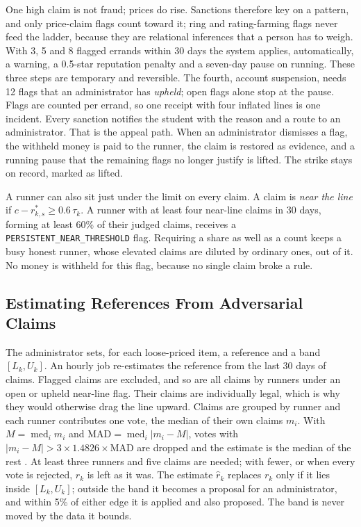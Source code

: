 \documentclass[journal]{IEEEtran}
\newcommand{\code}[1]{\texttt{#1}}
\begin{document}
One high claim is not fraud; prices do rise. Sanctions therefore key on a pattern,
and only price-claim flags count toward it; ring and rating-farming flags never feed
the ladder, because they are relational inferences that a person has to weigh. With
3, 5 and 8 flagged errands within 30 days the system applies, automatically, a
warning, a 0.5-star reputation penalty and a seven-day pause on running. These three
steps are temporary and reversible. The fourth, account suspension, needs 12 flags
that an administrator has \emph{upheld}; open flags alone stop at the pause. Flags
are counted per errand, so one receipt with four inflated lines is one incident.
Every sanction notifies the student with the reason and a route to an administrator.
That is the appeal path. When an administrator dismisses a flag, the withheld money
is paid to the runner, the claim is restored as evidence, and a running pause that
the remaining flags no longer justify is lifted. The strike stays on record, marked
as lifted.

A runner can also sit just under the limit on every claim. A claim is \emph{near the
line} if $c-r^*_{k,s}\ge0.6\,\tau_k$. A runner with at least four near-line claims in 30
days, forming at least 60\% of their judged claims, receives a
\code{PERSISTENT\_NEAR\_THRESHOLD} flag. Requiring a share as well as a count keeps
a busy honest runner, whose elevated claims are diluted by ordinary ones, out of it.
No money is withheld for this flag, because no single claim broke a rule.

\subsection{Estimating References From Adversarial Claims}\label{sec:design-reference}
The administrator sets, for each loose-priced item, a reference and a band
$[L_k,U_k]$. An hourly job re-estimates the reference from the last 30 days of
claims. Flagged claims are excluded, and so are all claims by runners under an open
or upheld near-line flag. Their claims are individually legal, which is why they
would otherwise drag the line upward. Claims are grouped by runner and each
runner contributes one vote, the median of their own claims $m_i$. With
$M=\operatorname{med}_i m_i$ and $\mathrm{MAD}=\operatorname{med}_i|m_i-M|$, votes with
$|m_i-M|>3\times1.4826\times\mathrm{MAD}$ are dropped and the estimate is the median of
the rest \cite{rousseeuw1993alternatives,leys2013detecting}. At least three runners
and five claims are needed; with fewer, or when every vote is rejected, $r_k$ is
left as it was. The estimate $\hat r_k$ replaces $r_k$ only if it lies inside
$[L_k,U_k]$; outside the band it becomes a proposal for an administrator, and within
5\% of either edge it is applied and also proposed. The band is never moved by the
data it bounds.
\end{document}
